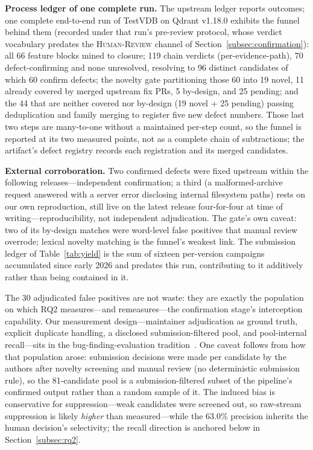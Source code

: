 \documentclass[acmsmall,screen,review,anonymous]{acmart}
\newcommand{\system}{TestVDB}
\begin{document}
\textbf{Process ledger of one complete run.} The upstream ledger reports outcomes; one complete end-to-end run of \system{} on Qdrant v1.18.0 exhibits the funnel behind them (recorded under that run's pre-review protocol, whose verdict vocabulary predates the \textsc{Human-Review} channel of Section~\ref{subsec:confirmation}): all 66 feature blocks mined to closure; 119 chain verdicts (per-evidence-path), 70 defect-confirming and none unresolved, resolving to 96 distinct candidates of which 60 confirm defects; the novelty gate partitioning those 60 into 19 novel, 11 already covered by merged upstream fix PRs, 5 by-design, and 25 pending; and the 44 that are neither covered nor by-design (19 novel + 25 pending) passing deduplication and family merging to register five new defect numbers. Those last two steps are many-to-one without a maintained per-step count, so the funnel is reported at its two measured points, not as a complete chain of subtractions; the artifact's defect registry records each registration and its merged candidates.

\textbf{External corroboration.} Two confirmed defects were fixed upstream within the following releases---independent confirmation; a third (a malformed-archive request answered with a server error disclosing internal filesystem paths) rests on our own reproduction, still live on the latest release four-for-four at time of writing---reproducibility, not independent adjudication. The gate's own caveat: two of its by-design matches were word-level false positives that manual review overrode; lexical novelty matching is the funnel's weakest link. The submission ledger of Table~\ref{tab:yield} is the sum of sixteen per-version campaigns accumulated since early 2026 and predates this run, contributing to it additively rather than being contained in it.

The 30 adjudicated false positives are not waste: they are exactly the population on which RQ2 measures---and remeasures---the confirmation stage's interception capability. Our measurement design---maintainer adjudication as ground truth, explicit duplicate handling, a disclosed submission-filtered pool, and pool-internal recall---sits in the bug-finding-evaluation tradition~\cite{klees18,magma21}. One caveat follows from how that population arose: submission decisions were made per candidate by the authors after novelty screening and manual review (no deterministic submission rule), so the 81-candidate pool is a submission-filtered subset of the pipeline's confirmed output rather than a random sample of it. The induced bias is conservative for suppression---weak candidates were screened out, so raw-stream suppression is likely \emph{higher} than measured---while the 63.0\% precision inherits the human decision's selectivity; the recall direction is anchored below in Section~\ref{subsec:rq2}.
\end{document}
